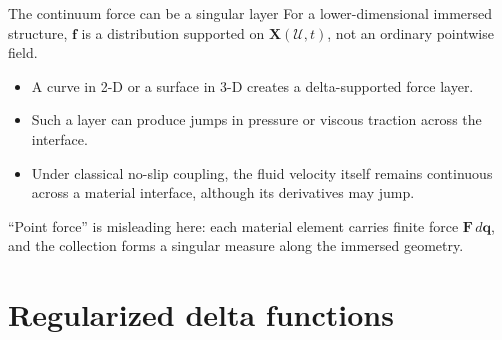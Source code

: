 \documentclass[aspectratio=169,11pt]{beamer}
\newcommand{\Xvec}{\bm{q}}
\newcommand{\chivec}{\bm{X}}
\newcommand{\fvec}{\bm{f}}
\newcommand{\Fvec}{\bm{F}}
\begin{document}
\begin{frame}{The continuum force can be a singular layer}
For a lower-dimensional immersed structure, \(\fvec\) is a distribution supported on \(\chivec(\mathcal U,t)\), not an ordinary pointwise field.

\begin{itemize}\itemsep7pt
  \item A curve in 2-D or a surface in 3-D creates a delta-supported force layer.
  \item Such a layer can produce jumps in pressure or viscous traction across the interface.
  \item Under classical no-slip coupling, the fluid velocity itself remains continuous across a material interface, although its derivatives may jump.
\end{itemize}

\begin{punchbox}
``Point force'' is misleading here: each material element carries finite force \(\Fvec\,d\Xvec\), and the collection forms a singular measure along the immersed geometry.
\end{punchbox}
\end{frame}

\section{Regularized delta functions}
\end{document}
